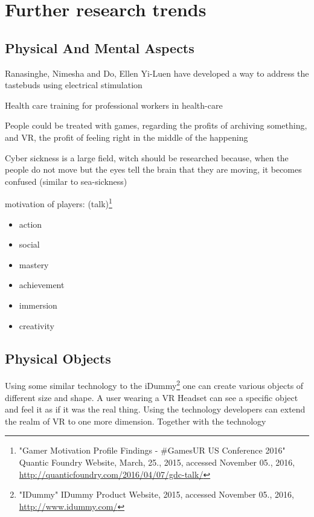 \section{Further research trends}
\subsection{Physical And Mental Aspects}

Ranasinghe, Nimesha and Do, Ellen Yi-Luen have developed a way to address the tastebuds using electrical stimulation \cite{Ranasinghe:2016:VSS:2984751.2985729}

Health care training for professional workers in health-care

People could be treated with games, regarding the profits of archiving something, and VR, the profit of feeling right in the middle of the happening

Cyber sickness is a large field, witch should be researched because, when the people do not move but the eyes tell the brain that they are moving, it becomes confused (similar to sea-sickness)

motivation of players: (talk)\footnote{"Gamer Motivation Profile Findings - \#GamesUR US Conference 2016" Quantic Foundry Website, March, 25., 2015, accessed November 05., 2016, \url{http://quanticfoundry.com/2016/04/07/gdc-talk/}}
\begin{itemize}
	\item action
	\item social
	\item mastery
	\item achievement
	\item immersion
	\item creativity
\end{itemize}


\subsection{Physical Objects}

Using some similar technology to the iDummy\footnote{"IDummy" IDummy Product Website, 2015, accessed November 05., 2016, \url{http://www.idummy.com/}} one can create various objects of different size and shape. A user wearing a VR Headset can see a specific object and feel it as if it was the real thing. Using the technology developers can extend the realm of VR to one more dimension. Together with the technology~\cite{Azmandian:2016:HRD:2858036.2858226}

